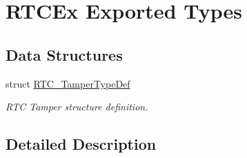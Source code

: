 \hypertarget{group___r_t_c_ex___exported___types}{}\section{R\+T\+C\+Ex Exported Types}
\label{group___r_t_c_ex___exported___types}
\subsection*{Data Structures}
\begin{DoxyCompactItemize}
\item 
struct \hyperlink{struct_r_t_c___tamper_type_def}{R\+T\+C\+\_\+\+Tamper\+Type\+Def}
\begin{DoxyCompactList}\small\item\em R\+TC Tamper structure definition. \end{DoxyCompactList}\end{DoxyCompactItemize}


\subsection{Detailed Description}
